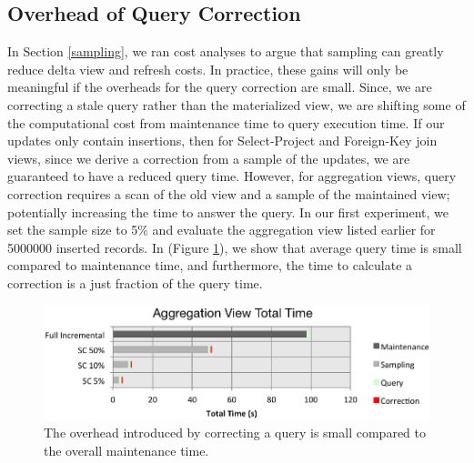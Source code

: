 \subsection{Overhead of Query Correction}
In Section \ref{sampling}, we ran cost analyses to argue that sampling can greatly reduce delta view and refresh costs.
In practice, these gains will only be meaningful if the overheads for the query correction are small.
Since, we are correcting a stale query rather than the materialized view, we are shifting some of the computational cost from maintenance time to query execution time.
If our updates only contain insertions, then for Select-Project and Foreign-Key join views, since we derive a correction from a sample of the updates, we are guaranteed to have a reduced query time.
However, for aggregation views, query correction requires a scan of the old view and a sample of the maintained view; potentially increasing the time to 
answer the query.
In our first experiment, we set the sample size to 5\% and evaluate the aggregation view listed earlier for 5000000 inserted records. 
In (Figure \ref{exp10overheads}), we show that average query time is small compared to maintenance time, and furthermore, 
the time to calculate a correction is a just fraction of the query time.
\begin{figure}[h]
\label{exp10overheads}
\centering
 \includegraphics[width=\columnwidth]{exp/total_time_agg_view.png}
 \caption{The overhead introduced by correcting a query is small compared to the overall maintenance time.}
\end{figure}

